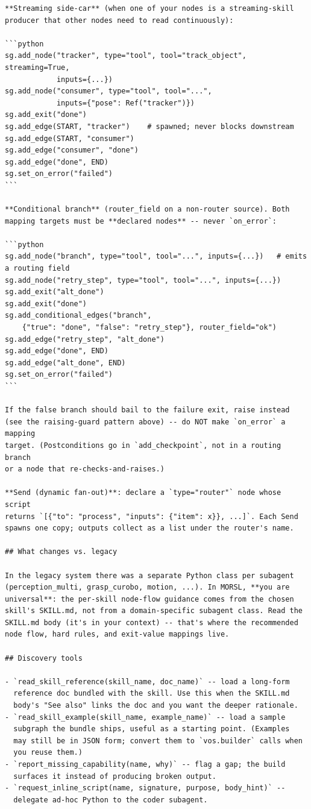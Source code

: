 \begin{lstlisting}
**Streaming side-car** (when one of your nodes is a streaming-skill
producer that other nodes need to read continuously):

```python
sg.add_node("tracker", type="tool", tool="track_object", streaming=True,
            inputs={...})
sg.add_node("consumer", type="tool", tool="...",
            inputs={"pose": Ref("tracker")})
sg.add_exit("done")
sg.add_edge(START, "tracker")    # spawned; never blocks downstream
sg.add_edge(START, "consumer")
sg.add_edge("consumer", "done")
sg.add_edge("done", END)
sg.set_on_error("failed")
```

**Conditional branch** (router_field on a non-router source). Both
mapping targets must be **declared nodes** -- never `on_error`:

```python
sg.add_node("branch", type="tool", tool="...", inputs={...})   # emits a routing field
sg.add_node("retry_step", type="tool", tool="...", inputs={...})
sg.add_exit("alt_done")
sg.add_exit("done")
sg.add_conditional_edges("branch",
    {"true": "done", "false": "retry_step"}, router_field="ok")
sg.add_edge("retry_step", "alt_done")
sg.add_edge("done", END)
sg.add_edge("alt_done", END)
sg.set_on_error("failed")
```

If the false branch should bail to the failure exit, raise instead
(see the raising-guard pattern above) -- do NOT make `on_error` a mapping
target. (Postconditions go in `add_checkpoint`, not in a routing branch
or a node that re-checks-and-raises.)

**Send (dynamic fan-out)**: declare a `type="router"` node whose script
returns `[{"to": "process", "inputs": {"item": x}}, ...]`. Each Send
spawns one copy; outputs collect as a list under the router's name.

## What changes vs. legacy

In the legacy system there was a separate Python class per subagent
(perception_multi, grasp_curobo, motion, ...). In MORSL, **you are
universal**: the per-skill node-flow guidance comes from the chosen
skill's SKILL.md, not from a domain-specific subagent class. Read the
SKILL.md body (it's in your context) -- that's where the recommended
node flow, hard rules, and exit-value mappings live.

## Discovery tools

- `read_skill_reference(skill_name, doc_name)` -- load a long-form
  reference doc bundled with the skill. Use this when the SKILL.md
  body's "See also" links the doc and you want the deeper rationale.
- `read_skill_example(skill_name, example_name)` -- load a sample
  subgraph the bundle ships, useful as a starting point. (Examples
  may still be in JSON form; convert them to `vos.builder` calls when
  you reuse them.)
- `report_missing_capability(name, why)` -- flag a gap; the build
  surfaces it instead of producing broken output.
- `request_inline_script(name, signature, purpose, body_hint)` --
  delegate ad-hoc Python to the coder subagent.


\end{lstlisting}
